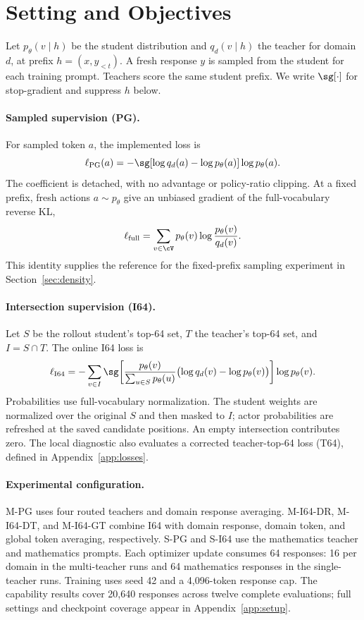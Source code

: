 \section{Setting and Objectives}
\label{sec:setting}

Let $p_\theta(v\mid h)$ be the student distribution and $q_d(v\mid h)$ the teacher for domain $d$, at prefix $h=(x,y_{<t})$. A fresh response $y$ is sampled from the student for each training prompt. Teachers score the same student prefix. We write $\sg[\cdot]$ for stop-gradient and suppress $h$ below.

\paragraph{Sampled supervision (PG).}
For sampled token $a$, the implemented loss is
\begin{equation}
\ell_{\mathrm{PG}}(a)=-\sg[\log q_d(a)-\log p_\theta(a)]\log p_\theta(a).
\label{eq:pg}
\end{equation}
The coefficient is detached, with no advantage or policy-ratio clipping. At a fixed prefix, fresh actions $a\sim p_\theta$ give an unbiased gradient of the full-vocabulary reverse KL,
\begin{equation}
\ell_{\mathrm{full}}=\sum_{v\in\cV}p_\theta(v)\log\frac{p_\theta(v)}{q_d(v)}.
\label{eq:full}
\end{equation}
This identity supplies the reference for the fixed-prefix sampling experiment in Section~\ref{sec:density}.

\paragraph{Intersection supervision (I64).}
Let $S$ be the rollout student's top-64 set, $T$ the teacher's top-64 set, and $I=S\cap T$. The online I64 loss is
\begin{equation}
\ell_{\mathrm{I64}}=-\sum_{v\in I}\sg\!\left[
\frac{p_\theta(v)}{\sum_{u\in S}p_\theta(u)}
\bigl(\log q_d(v)-\log p_\theta(v)\bigr)\right]\log p_\theta(v).
\label{eq:i64}
\end{equation}
Probabilities use full-vocabulary normalization. The student weights are normalized over the original $S$ and then masked to $I$; actor probabilities are refreshed at the saved candidate positions. An empty intersection contributes zero. The local diagnostic also evaluates a corrected teacher-top-64 loss (T64), defined in Appendix~\ref{app:losses}.

\paragraph{Experimental configuration.}
M-PG uses four routed teachers and domain response averaging. M-I64-DR, M-I64-DT, and M-I64-GT combine I64 with domain response, domain token, and global token averaging, respectively. S-PG and S-I64 use the mathematics teacher and mathematics prompts. Each optimizer update consumes 64 responses: 16 per domain in the multi-teacher runs and 64 mathematics responses in the single-teacher runs. Training uses seed 42 and a 4,096-token response cap. The capability results cover 20,640 responses across twelve complete evaluations; full settings and checkpoint coverage appear in Appendix~\ref{app:setup}.
